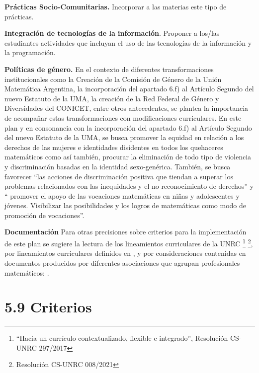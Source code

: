 \documentclass[a4paper, 12pt]{article}
\begin{document}
\begin{description}
\item{\textbf{Prácticas Socio-Comunitarias.} } Incorporar a las materias este tipo de prácticas.


\item{ \textbf{Integración de tecnologías de la información}.} Proponer a los/las estudiantes actividades que incluyan el uso de las tecnologías de la información y la programación.  



\item{\textbf{Políticas de género.}}
En el contexto de diferentes transformaciones institucionales como la Creación de la Comisión de Género de la Unión Matemática Argentina, la incorporación del apartado 6.f) al Artículo Segundo del nuevo Estatuto de la UMA, la creación de la Red Federal de Género y Diversidades del CONICET, entre otros antecedentes, se plantea la importancia de acompañar estas transformaciones con  modificaciones curriculares. 
En este plan y en consonancia con la incorporación del apartado 6.f) al Artículo Segundo del nuevo Estatuto de la UMA, se  busca promover la equidad en relación a los derechos de las mujeres e identidades disidentes en todos los quehaceres matemáticos  como así también,  procurar la eliminación de todo tipo de violencia y discriminación basadas en la identidad sexo-genérica.
También, se busca favorecer “las acciones de discriminación positiva que tiendan a superar los problemas relacionados con las inequidades y el no reconocimiento de derechos”  y    “ promover el apoyo de las vocaciones matemáticas en niñas y adolescentes y jóvenes. Visibilizar las posibilidades y los logros de matemáticas como modo de promoción de vocaciones”.
 
 \item{\textbf{Documentación}} Para otras precisiones sobre criterios para la implementación de este plan se sugiere la lectura de los lineamientos curriculares de la UNRC \footnote{``Hacia   un   currículo contextualizado, flexible e integrado'', Resolución CS-UNRC 297/2017 }
\footnote{ Resolución CS-UNRC 008/2021}, por lineamientos curriculares definidos en  \cite{paniagua2013educacion}, y por consideraciones contenidas en documentos producidos por diferentes asociaciones que agrupan profesionales matemáticos: \cite{uma,society1996siam,society2012siam,damlamian2013educational}.

\end{description}




\section{5.9 Criterios}  
\end{document}

